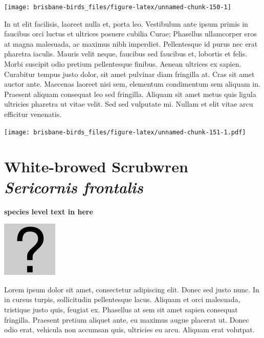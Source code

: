 \documentclass[]{book}
\let\origfigure\figure
\let\endorigfigure\endfigure
\renewenvironment{figure}[1][2] {
  \expandafter\origfigure\expandafter[H]
} {
  \endorigfigure
}
\begin{document}
\begin{figure}
\texttt{[image: brisbane-birds\_files/figure-latex/unnamed-chunk-150-1]} \caption{insert figure caption}\label{fig:unnamed-chunk-150}
\end{figure}

In ut elit facilisis, laoreet nulla et, porta leo. Vestibulum ante ipsum
primis in faucibus orci luctus et ultrices posuere cubilia Curae;
Phasellus ullamcorper eros at magna malesuada, ac maximus nibh
imperdiet. Pellentesque id purus nec erat pharetra iaculis. Mauris velit
neque, faucibus sed faucibus et, lobortis et felis. Morbi suscipit odio
pretium pellentesque finibus. Aenean ultrices ex sapien. Curabitur
tempus justo dolor, sit amet pulvinar diam fringilla at. Cras sit amet
auctor ante. Maecenas laoreet nisi sem, elementum condimentum sem
aliquam in. Praesent aliquam consequat leo sed fringilla. Aliquam sit
amet metus quis ligula ultricies pharetra ut vitae velit. Sed sed
vulputate mi. Nullam et elit vitae arcu efficitur venenatis.

\begin{figure}
\centering
\texttt{[image: brisbane-birds\_files/figure-latex/unnamed-chunk-151-1.pdf]}
\caption{\label{fig:unnamed-chunk-151}insert figure caption}
\end{figure}

\section{\texorpdfstring{White-browed Scrubwren \emph{Sericornis
frontalis}}{White-browed Scrubwren Sericornis frontalis}}\label{white-browed-scrubwren-sericornis-frontalis}

\textbf{species level text in here}

\begin{figure}
\centering
\includegraphics{assets/missing.png}
\caption{No image for species}
\end{figure}

Lorem ipsum dolor sit amet, consectetur adipiscing elit. Donec sed justo
nunc. In in cursus turpis, sollicitudin pellentesque lacus. Aliquam et
orci malesuada, tristique justo quis, feugiat ex. Phasellus at sem sit
amet sapien consequat fringilla. Praesent pretium aliquet ante, eu
maximus augue placerat ut. Donec odio erat, vehicula non accumsan quis,
ultricies eu arcu. Aliquam erat volutpat.
\end{document}
